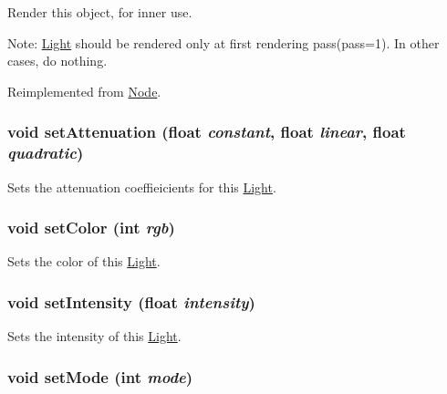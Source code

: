 Render this object, for inner use.

Note: \hyperlink{classm3g_1_1Light}{Light} should be rendered only at first rendering pass(pass=1). In other cases, do nothing. 

Reimplemented from \hyperlink{classm3g_1_1Node_8babc8a79b78615da51161e94029eea9}{Node}.\hypertarget{classm3g_1_1Light_391c5cff137fc2e810f5129a5381196f}{
\subsubsection[{setAttenuation}]{\setlength{\rightskip}{0pt plus 5cm}void setAttenuation (float {\em constant}, \/  float {\em linear}, \/  float {\em quadratic})}}
\label{classm3g_1_1Light_391c5cff137fc2e810f5129a5381196f}


Sets the attenuation coeffieicients for this \hyperlink{classm3g_1_1Light}{Light}. \hypertarget{classm3g_1_1Light_b1f5cc0f5cc6bbbd716a526c61f1081d}{
\subsubsection[{setColor}]{\setlength{\rightskip}{0pt plus 5cm}void setColor (int {\em rgb})}}
\label{classm3g_1_1Light_b1f5cc0f5cc6bbbd716a526c61f1081d}


Sets the color of this \hyperlink{classm3g_1_1Light}{Light}. \hypertarget{classm3g_1_1Light_ce02325cb6289c007d569c193641c468}{
\subsubsection[{setIntensity}]{\setlength{\rightskip}{0pt plus 5cm}void setIntensity (float {\em intensity})}}
\label{classm3g_1_1Light_ce02325cb6289c007d569c193641c468}


Sets the intensity of this \hyperlink{classm3g_1_1Light}{Light}. \hypertarget{classm3g_1_1Light_9f407b18ba6235cb96fa95611c1ea3a4}{
\subsubsection[{setMode}]{\setlength{\rightskip}{0pt plus 5cm}void setMode (int {\em mode})}}
\label{classm3g_1_1Light_9f407b18ba6235cb96fa95611c1ea3a4}


